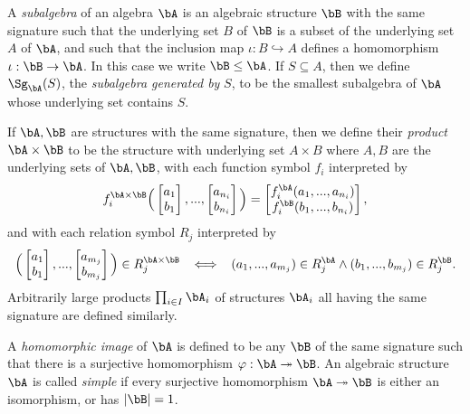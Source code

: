 \begin{defn} A \emph{subalgebra} of an algebra $\bA$ is an algebraic structure $\bB$ with the same signature such that the underlying set $B$ of $\bB$ is a subset of the underlying set $A$ of $\bA$, and such that the inclusion map $\iota : B \hookrightarrow A$ defines a homomorphism $\iota : \bB \rightarrow \bA$. In this case we write $\bB \le \bA$. If $S \subseteq A$, then we define $\Sg_\bA(S)$, the \emph{subalgebra generated by} $S$, to be the smallest subalgebra of $\bA$ whose underlying set contains $S$.

If $\bA, \bB$ are structures with the same signature, then we define their \emph{product} $\bA \times \bB$ to be the structure with underlying set $A\times B$ where $A,B$ are the underlying sets of $\bA,\bB$, with each function symbol $f_i$ interpreted by
\[
f_i^{\bA\times\bB}\Big(\begin{bmatrix}a_1\\b_1\end{bmatrix},...,\begin{bmatrix}a_{n_i}\\b_{n_i}\end{bmatrix}\Big) = \begin{bmatrix}f_i^\bA(a_1, ..., a_{n_i})\\f_i^\bB(b_1, ..., b_{n_i})\end{bmatrix},
\]
and with each relation symbol $R_j$ interpreted by
\[
\Big(\begin{bmatrix}a_1\\b_1\end{bmatrix},...,\begin{bmatrix}a_{m_j}\\b_{m_j}\end{bmatrix}\Big) \in R_j^{\bA\times\bB} \;\; \iff \;\; (a_1, ..., a_{m_j}) \in R_j^\bA \wedge (b_1, ..., b_{m_j}) \in R_j^\bB.
\]
Arbitrarily large products $\prod_{i \in I} \bA_i$ of structures $\bA_i$ all having the same signature are defined similarly.

A \emph{homomorphic image} of $\bA$ is defined to be any $\bB$ of the same signature such that there is a surjective homomorphism $\varphi : \bA \twoheadrightarrow \bB$. An algebraic structure $\bA$ is called \emph{simple} if every surjective homomorphism $\bA \twoheadrightarrow \bB$ is either an isomorphism, or has $|\bB| = 1$.
\end{defn}

